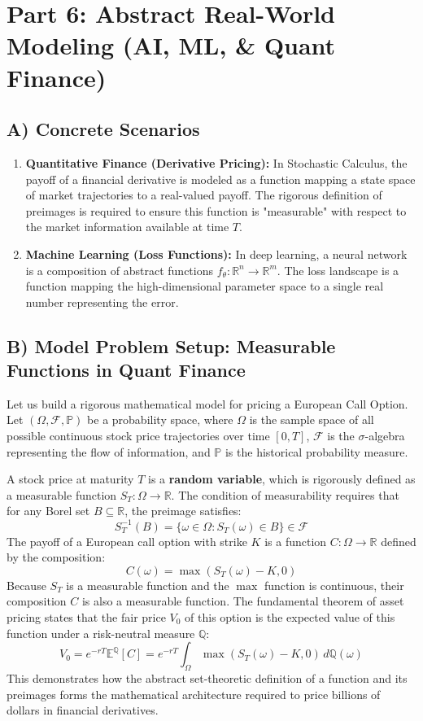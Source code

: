 \documentclass[11pt, a4paper]{article}
\theoremstyle{definition}
\theoremstyle{remark}
\newcommand{\R}{\mathbb{R}}
\newcommand{\E}{\mathbb{E}}
\newcommand{\Prob}{\mathbb{P}}
\newcommand{\F}{\mathcal{F}}
\begin{document}
\section{Part 6: Abstract Real-World Modeling (AI, ML, \& Quant Finance)}

\subsection{A) Concrete Scenarios}
\begin{enumerate}
    \item \textbf{Quantitative Finance (Derivative Pricing):} In Stochastic Calculus, the payoff of a financial derivative is modeled as a function mapping a state space of market trajectories to a real-valued payoff. The rigorous definition of preimages is required to ensure this function is "measurable" with respect to the market information available at time $T$.
    \item \textbf{Machine Learning (Loss Functions):} In deep learning, a neural network is a composition of abstract functions $f_{\theta}: \R^n \to \R^m$. The loss landscape is a function mapping the high-dimensional parameter space to a single real number representing the error.
\end{enumerate}

\subsection{B) Model Problem Setup: Measurable Functions in Quant Finance}
Let us build a rigorous mathematical model for pricing a European Call Option. 
Let $(\Omega, \F, \Prob)$ be a probability space, where $\Omega$ is the sample space of all possible continuous stock price trajectories over time $[0, T]$, $\F$ is the $\sigma$-algebra representing the flow of information, and $\Prob$ is the historical probability measure.

A stock price at maturity $T$ is a \textbf{random variable}, which is rigorously defined as a measurable function $S_T: \Omega \to \R$. The condition of measurability requires that for any Borel set $B \subseteq \R$, the preimage satisfies:
\[ S_T^{-1}(B) = \{\omega \in \Omega : S_T(\omega) \in B\} \in \F \]
The payoff of a European call option with strike $K$ is a function $C: \Omega \to \R$ defined by the composition:
\[ C(\omega) = \max(S_T(\omega) - K, 0) \]
Because $S_T$ is a measurable function and the $\max$ function is continuous, their composition $C$ is also a measurable function. The fundamental theorem of asset pricing states that the fair price $V_0$ of this option is the expected value of this function under a risk-neutral measure $\mathbb{Q}$:
\[ V_0 = e^{-rT} \E^{\mathbb{Q}}[C] = e^{-rT} \int_{\Omega} \max(S_T(\omega) - K, 0) \, d\mathbb{Q}(\omega) \]
This demonstrates how the abstract set-theoretic definition of a function and its preimages forms the mathematical architecture required to price billions of dollars in financial derivatives.
\end{document}
